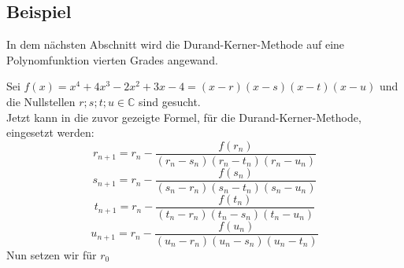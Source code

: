 \documentclass[12pt]{article}
\begin{document}
    \subsection{Beispiel}
        In dem nächsten Abschnitt wird die Durand-Kerner-Methode auf eine Polynomfunktion vierten Grades angewand. \par
        Sei $f(x) = x^4 + 4x^3 - 2x^2 + 3x - 4 = (x-r)(x-s)(x-t)(x-u)$ und die Nullstellen $r;s;t;u \in \mathbb{C}$ sind gesucht. \\
        Jetzt kann in die zuvor gezeigte Formel, für die Durand-Kerner-Methode, eingesetzt werden:
        \begin{displaymath}
            r_{n+1} = r_n-\frac{f(r_n)}{(r_n-s_n)(r_n-t_n)(r_n-u_n)}
        \end{displaymath}
        \begin{displaymath}
            s_{n+1} = r_n-\frac{f(s_n)}{(s_n-r_n)(s_n-t_n)(s_n-u_n)}
        \end{displaymath}
        \begin{displaymath}
            t_{n+1} = r_n-\frac{f(t_n)}{(t_n-r_n)(t_n-s_n)(t_n-u_n)}
        \end{displaymath}
        \begin{displaymath}
            u_{n+1} = r_n-\frac{f(u_n)}{(u_n-r_n)(u_n-s_n)(u_n-t_n)}
        \end{displaymath}
        \vspace{0.2cm}
        Nun setzen wir für $r_0$ %
\end{document}
